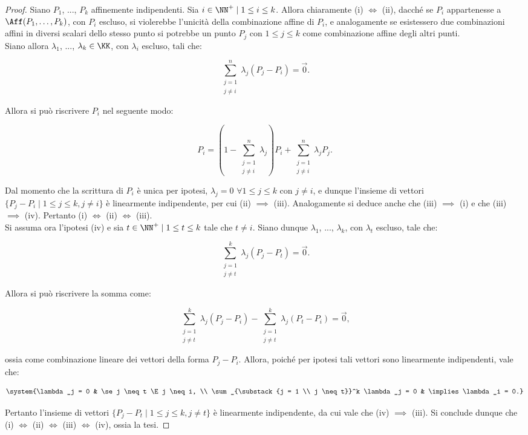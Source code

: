 \documentclass[11pt]{article}
\begin{document}
	\begin{proof}
		Siano $P_1$, ..., $P_k$ affinemente indipendenti. Sia $i \in \NN^+ \mid 1 \leq i \leq k$.
		Allora chiaramente (i) $\iff$ (ii), dacché se $P_i$ appartenesse a $\Aff(P_1, \ldots, P_k)$, con
		$P_i$ escluso, si violerebbe l'unicità della combinazione affine di $P_i$, e analogamente se
		esistessero due combinazioni affini in diversi scalari dello stesso punto si potrebbe
		un punto $P_j$ con $1 \leq j \leq k$ come combinazione affine degli altri punti. \\
		
		Siano allora $\lambda_1$, ..., $\lambda_k \in \KK$, con $\lambda_i$ escluso, tali che:
		
		\[ \sum_{\substack{j = 1 \\ j \neq i}}^n \lambda_j (P_j - P_i) = \vec 0. \]
		
		Allora si può riscrivere $P_i$ nel seguente modo:
		
		\[ P_i = \left(1 - \sum_{\substack{j = 1 \\ j \neq i}}^n \lambda_j\right) P_i + \sum_{\substack{j = 1 \\ j \neq i}}^n \lambda_j P_j. \]
		
		\vskip 0.05in
		
		Dal momento che la scrittura di $P_i$ è unica per ipotesi, $\lambda_j = 0$ $\forall 1 \leq j \leq k$ con $j \neq i$, e dunque l'insieme di vettori $\{ P_j - P_i \mid 1 \leq j \leq k, j \neq i \}$ è linearmente
		indipendente, per cui (ii) \mbox{$\implies$} (iii). Analogamente si deduce anche che (iii) \mbox{$\implies$} (i) e che (iii) \mbox{$\implies$} (iv). Pertanto (i) \mbox{$\iff$} (ii) \mbox{$\iff$} (iii). \\
		
		Si assuma ora l'ipotesi (iv) e sia $t \in \NN^+ \mid 1 \leq t \leq k$ tale che $t \neq i$. Siano
		dunque $\lambda_1$, ..., $\lambda_k$, con $\lambda_t$ escluso, tale che:
		
		\[ \sum_{\substack{j = 1 \\ j \neq t}}^k \lambda_j (P_j - P_t) = \vec 0. \]
		
		Allora si può riscrivere la somma come:
		
		\[ \sum_{\substack{j = 1 \\ j \neq t}}^k \lambda_j (P_j - P_i) - \sum_{\substack{j = 1 \\ j \neq t}}^k \lambda_j (P_t - P_i) = \vec 0, \]
		
		\vskip 0.05in
		ossia come combinazione lineare dei vettori della forma $P_j - P_i$. Allora, poiché per ipotesi tali
		vettori sono linearmente indipendenti, vale che:
		
		\[ \system{\lambda_j = 0 & \se j \neq t \E j \neq i, \\  \sum_{\substack{j = 1 \\ j \neq t}}^k \lambda_j = 0 & \implies \lambda_i = 0.} \]
		
		Pertanto l'insieme di vettori $\{ P_j - P_t \mid 1 \leq j \leq k, j \neq t \}$ è linearmente indipendente,
		da cui vale che (iv) \mbox{$\implies$} (iii). Si conclude dunque che
		(i) \mbox{$\iff$} (ii) \mbox{$\iff$} (iii) \mbox{$\iff$} (iv), ossia la tesi.
	\end{proof}
\end{document}
